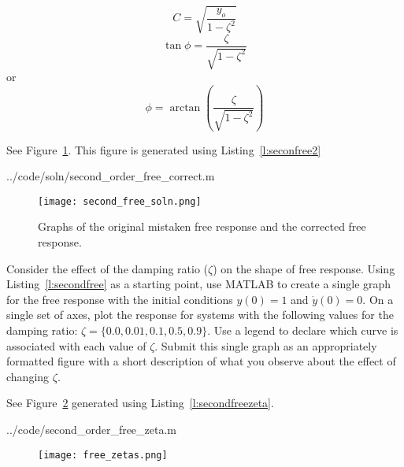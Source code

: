 \ifsolutions
\begin{soln}
\[ C = \sqrt{\frac{y_o}{1-\zeta^2}} \]
\[ \tan\phi = \frac{\zeta}{\sqrt{1-\zeta^2}} \]
or 
\[ \phi = \arctan\left(\frac{\zeta}{\sqrt{1-\zeta^2}}\right) \]

See Figure~\ref{f:secondfreesoln}.  This figure is generated using Listing~\ref{l:seconfree2}


{../code/soln/second_order_free_correct.m}

\begin{figure}[hbt]
\centering
\texttt{[image: second\_free\_soln.png]}
\caption{Graphs of the original mistaken free response and the corrected free response.}
\label{f:secondfreesoln}
\end{figure}
\end{soln}
\fi

\begin{ex}
Consider the effect of the damping ratio ($\zeta$) on the shape of free response.  Using Listing~\ref{l:secondfree} as a starting point, use MATLAB to create a single graph for the free response with the initial conditions $y(0)=1$ and $\dot{y}(0)=0$.  On a single set of axes, plot the response for systems with the following values for the damping ratio: $\zeta=\{0.0, 0.01 , 0.1, 0.5, 0.9\}$.  Use a legend to declare which curve is associated with each value of $\zeta$.  Submit this single graph as an appropriately formatted figure with a short description of what you observe about the effect of changing $\zeta$.
\end{ex}

\ifsolutions
\begin{soln}
See Figure~\ref{f:secondfreezetas} generated using Listing~\ref{l:secondfreezeta}.


{../code/second_order_free_zeta.m}


\begin{figure}[hbt]
\centering
\texttt{[image: free\_zetas.png]}
\caption{}
\label{f:secondfreezetas}
\end{figure}

\end{soln}
\fi

